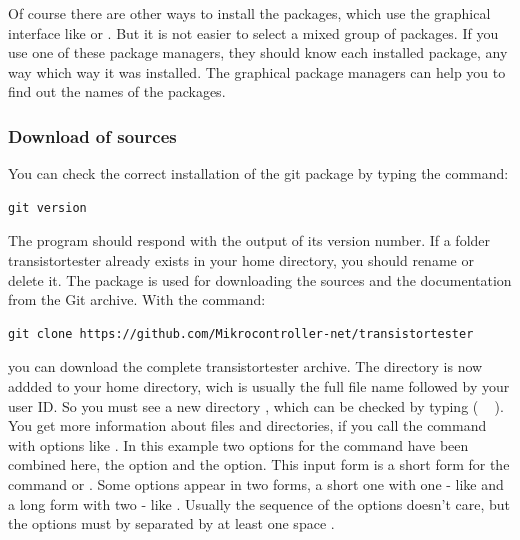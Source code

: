 Of course there are other ways to install the packages, which use the graphical interface
like  or . But it is not easier to select a mixed group of packages.
If you use one of these package managers, they should know each installed package,
any way which way it was installed.
The graphical package managers can help you to find out the names of the packages.


\subsubsection{Download of sources}

You can check the correct installation of the git package by typing the command:
\begin{large} \vspace{-0.4em} \begin{verbatim}
git version
\end{verbatim} \end{large}
The  program should respond with the output of its version number.
If a folder transistortester already exists in your home directory,
you should rename or delete it.
The package  is used for downloading the sources and the documentation from the Git archive.
With the command:
\begin{large} \vspace{-0.4em} \begin{verbatim}
git clone https://github.com/Mikrocontroller-net/transistortester
\end{verbatim} \end{large}
you can download the complete transistortester archive.
The directory  is now addded to your home directory,
wich is usually the full file name  followed by your user ID.
So you must see a new directory , which can
be checked by typing  ( \mbox{  \keys{\return}} ).
You get more information about files and directories, if you call
the command with options like .
In this example two options for the  command have been combined here,
the  option and the  option.
This input form is a short form for the command  or
.
Some options appear in two forms, a short one with one - like  and a long form
with two -  like .
Usually the sequence of the options doesn't care, but the options must by separated
by at least one space \keys{\space}.
